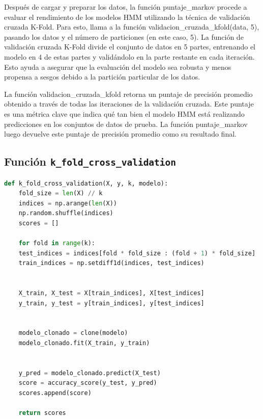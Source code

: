 \documentclass[12pt]{article}
\begin{document}
Después de cargar y preparar los datos, la función puntaje\_markov procede a evaluar el rendimiento de los modelos HMM utilizando la técnica de validación cruzada K-Fold. Para esto, llama a la función validacion\_cruzada\_kfold(data, 5), pasando los datos y el número de particiones (en este caso, 5). La función de validación cruzada K-Fold divide el conjunto de datos en 5 partes, entrenando el modelo en 4 de estas partes y validándolo en la parte restante en cada iteración. Esto ayuda a asegurar que la evaluación del modelo sea robusta y menos propensa a sesgos debido a la partición particular de los datos.\vspace{1cm}

La función validacion\_cruzada\_kfold retorna un puntaje de precisión promedio obtenido a través de todas las iteraciones de la validación cruzada. Este puntaje es una métrica clave que indica qué tan bien el modelo HMM está realizando predicciones en los conjuntos de datos de prueba. La función puntaje\_markov luego devuelve este puntaje de precisión promedio como su resultado final.


\vspace{1cm}

\subsection*{Función \texttt{k\_fold\_cross\_validation}}
\vspace{1cm}

\begin{lstlisting}[language=Python]
def k_fold_cross_validation(X, y, k, modelo):
	fold_size = len(X) // k
	indices = np.arange(len(X))
	np.random.shuffle(indices)
	scores = []
	
	for fold in range(k):
	test_indices = indices[fold * fold_size : (fold + 1) * fold_size]
	train_indices = np.setdiff1d(indices, test_indices)
	
	
	X_train, X_test = X[train_indices], X[test_indices]
	y_train, y_test = y[train_indices], y[test_indices]
	
	
	modelo_clonado = clone(modelo)
	modelo_clonado.fit(X_train, y_train)
	
	
	y_pred = modelo_clonado.predict(X_test)
	score = accuracy_score(y_test, y_pred)
	scores.append(score)
	
	return scores
	
\end{lstlisting}
\vspace{1cm}
\end{document}
